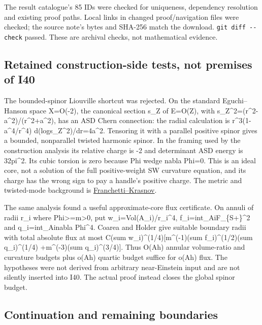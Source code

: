 \documentclass[
  10pt,
]{article}
\begin{document}
The result catalogue's 85 IDs were checked for uniqueness, dependency
resolution and existing proof paths. Local links in changed
proof/navigation files were checked; the source note's bytes and SHA-256
match the download. \texttt{git\ diff\ -\/-check} passed. These are
archival checks, not mathematical evidence.

\hypertarget{retained-construction-side-tests-not-premises-of-i40}{%
\subsection{Retained construction-side tests, not premises of
I40}\label{retained-construction-side-tests-not-premises-of-i40}}

The bounded-spinor Liouville shortcut was rejected. On the standard
Eguchi--Hanson space X=O(-2), the canonical section s\_Z of E=O(Z), with
\textbar s\_Z\textbar\^{}2=(r\^{}2-a\^{}2)/(r\^{}2+a\^{}2), has an ASD
Chern connection: the radial calculation is r\^{}3(1-a\^{}4/r\^{}4)
d(log\textbar s\_Z\textbar\^{}2)/dr=4a\^{}2. Tensoring it with a
parallel positive spinor gives a bounded, nonparallel twisted harmonic
spinor. In the framing used by the construction analysis its relative
charge is -2 and determinant ASD energy is 32pi\^{}2. Its cubic torsion
is zero because Phi wedge nabla Phi=0. This is an ideal core, not a
solution of the full positive-weight SW curvature equation, and its
charge has the wrong sign to pay a handle's positive charge. The metric
and twisted-mode background is
\href{https://arxiv.org/abs/2309.08453}{Franchetti--Krasnov}.

The same analysis found a useful approximate-core flux certificate. On
annuli of radii r\_i where
\textbar Phi\textbar\textgreater=m\textgreater0, put
w\_i=Vol(A\_i)/r\_i\^{}4, f\_i=int\_Ai\textbar F\_\{S+\}\textbar\^{}2
and q\_i=int\_Ai\textbar nabla Phi\textbar\^{}4. Coarea and Holder give
suitable boundary radii with total absolute flux at most C(sum
w\_i)\^{}(1/4){[}m\^{}(-1)(sum f\_i)\^{}(1/2)(sum q\_i)\^{}(1/4)
+m\^{}(-3)(sum q\_i)\^{}(3/4){]}. Thus O(Ah) annular volume-ratio and
curvature budgets plus o(Ah) quartic budget suffice for o(Ah) flux. The
hypotheses were not derived from arbitrary near-Einstein input and are
not silently inserted into I40. The actual proof instead closes the
global spinor budget.

\hypertarget{continuation-and-remaining-boundaries}{%
\subsection{Continuation and remaining
boundaries}\label{continuation-and-remaining-boundaries}}
\end{document}
